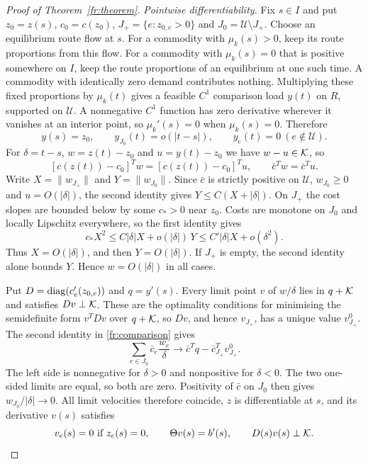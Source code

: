 \begin{proof}[Proof of Theorem~\ref{fr:theorem}]
\emph{Pointwise differentiability.} Fix $s\in I$ and put $z_0=z(s)$, $c_0=c(z_0)$, $J_+=\{e:z_{0,e}>0\}$ and $J_0=\mathcal U\setminus J_+$. Choose an equilibrium route flow at $s$. For a commodity with $\mu_k(s)>0$, keep its route proportions from this flow. For a commodity with $\mu_k(s)=0$ that is positive somewhere on $I$, keep the route proportions of an equilibrium at one such time. A commodity with identically zero demand contributes nothing. Multiplying these fixed proportions by $\mu_k(t)$ gives a feasible $C^1$ comparison load $y(t)$ on $R$, supported on $\mathcal U$. A nonnegative $C^1$ function has zero derivative wherever it vanishes at an interior point, so $\mu_k'(s)=0$ when $\mu_k(s)=0$. Therefore
\[
 y(s)=z_0,\qquad y_{J_0}(t)=o(|t-s|),\qquad y_e(t)=0\ (e\notin\mathcal U).
\]
For $\delta=t-s$, $w=z(t)-z_0$ and $u=y(t)-z_0$ we have $w-u\in\mathcal K$, so
\begin{equation}\label{fr:comparison}
 [c(z(t))-c_0]^Tw=[c(z(t))-c_0]^Tu,
 \qquad \bar c^Tw=\bar c^Tu.
\end{equation}
Write $X=\|w_{J_+}\|$ and $Y=\|w_{J_0}\|$. Since $\bar c$ is strictly positive on $\mathcal U$, $w_{J_0}\ge0$ and $u=O(|\delta|)$, the second identity gives $Y\le C(X+|\delta|)$. On $J_+$ the cost slopes are bounded below by some $c_*>0$ near $z_0$. Costs are monotone on $J_0$ and locally Lipschitz everywhere, so the first identity gives
\[
 c_*X^2\le C|\delta|X+o(|\delta|)\,Y\le C'|\delta|X+o(\delta^2).
\]
Thus $X=O(|\delta|)$, and then $Y=O(|\delta|)$. If $J_+$ is empty, the second identity alone bounds $Y$. Hence $w=O(|\delta|)$ in all cases.

Put $D=\operatorname{diag}(c'_e(z_{0,e}))$ and $q=y'(s)$. Every limit point $v$ of $w/\delta$ lies in $q+\mathcal K$ and satisfies $Dv\perp\mathcal K$. These are the optimality conditions for minimising the semidefinite form $v^TDv$ over $q+\mathcal K$, so $Dv$, and hence $v_{J_+}$, has a unique value $v^0_{J_+}$. The second identity in \eqref{fr:comparison} gives
\begin{equation}\label{fr:zero_sign}
 \sum_{e\in J_0}\bar c_e\frac{w_e}{\delta}\longrightarrow \bar c^Tq-\bar c_{J_+}^Tv^0_{J_+}.
\end{equation}
The left side is nonnegative for $\delta>0$ and nonpositive for $\delta<0$. The two one-sided limits are equal, so both are zero. Positivity of $\bar c$ on $J_0$ then gives $w_{J_0}/|\delta|\to0$. All limit velocities therefore coincide, $z$ is differentiable at $s$, and its derivative $v(s)$ satisfies
\begin{equation}\label{fr:derivative}
 v_e(s)=0\ \text{if }z_e(s)=0,
 \qquad \Theta v(s)=b'(s),\qquad D(s)v(s)\perp\mathcal K.
\end{equation}


\end{proof}
